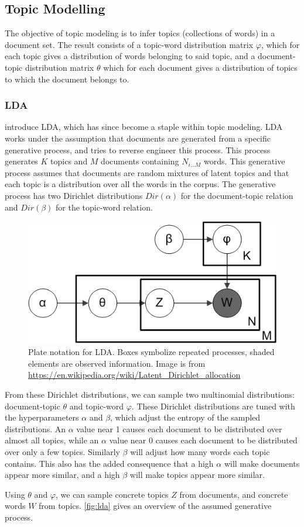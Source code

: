 \subsection{Topic Modelling}\label{subsec:topicModelling}
The objective of topic modeling is to infer topics (collections of words) in a document set.
The result consists of a topic-word distribution matrix $\varphi$, which for each topic gives a distribution of words belonging to said topic, and a document-topic distribution matrix $\theta$ which for each document gives a distribution of topics to which the document belongs to.

\subsubsection{\acrlong{LDA}}\label{subsec:lda}
 introduce \gls{LDA}, which has since become a staple within topic modeling.
\gls{LDA} works under the assumption that documents are generated from a specific generative process, and tries to reverse engineer this process.
This process generates $K$ topics and $M$ documents containing $N_{i\dots M}$ words.
This generative process assumes that documents are random mixtures of latent topics and that each topic is a distribution over all the words in the corpus.
The generative process has two Dirichlet distributions $Dir(\alpha)$ for the document-topic relation and $Dir(\beta)$ for the topic-word relation.

\begin{figure}[h]
	\centering
	\includegraphics[width= 0.3 \textwidth]{figures/Smoothed_LDA.PNG}
	\caption{Plate notation for \gls{LDA}. Boxes symbolize repeated processes, shaded elements are observed information. Image is from \url{https://en.wikipedia.org/wiki/Latent_Dirichlet_allocation}}
	\label{fig:lda}
\end{figure}

From these Dirichlet distributions, we can sample two multinomial distributions: document-topic $\theta$ and topic-word $\varphi$.
These Dirichlet distributions are tuned with the hyperparameters $\alpha$ and $\beta$, which adjust the entropy of the sampled distributions.
An $\alpha$ value near 1 causes each document to be distributed over almost all topics, while an $\alpha$ value near 0 causes each document to be distributed over only a few topics.
Similarly $\beta$ will adjust how many words each topic contains.
This also has the added consequence that a high $\alpha$ will make documents appear more similar, and a high $\beta$ will make topics appear more similar.

Using $\theta$ and $\varphi$, we can sample concrete topics $Z$ from documents, and concrete words $W$ from topics.
\autoref{fig:lda} gives an overview of the assumed generative process.
